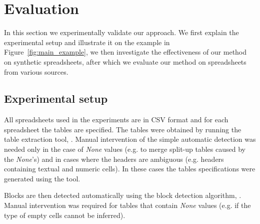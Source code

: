 \newcommand{\runtotal}{16.12}
\newcommand{\runtotalstd}{0.62}

\newcommand{\runfile}{0.50}
\newcommand{\runfilestd}{0.02}

\newcommand{\benchsize}{??}
\newcommand{\timeout}{200}

\section{Evaluation}\label{sec:evaluation}
In this section we experimentally validate our approach.
We first explain the experimental setup and illustrate it on the example in Figure~\ref{fig:main_example}, we then investigate the effectiveness of our method on synthetic spreadsheets, after which we evaluate our method on spreadsheets from various sources.

\subsection{Experimental setup}
\label{sec:evalualtion:method}
All spreadsheets used in the experiments are in CSV format and for each spreadsheet the tables are specified.
The tables were obtained by running the table extraction tool, \added{\ecautoextract}.
Manual intervention of the simple automatic detection was needed only in the case of \textit{None} values (e.g. to merge split-up tables caused by the \textit{None}'s) and in cases where the headers are ambiguous (e.g. headers containing textual and numeric cells).
In these cases the tables specifications were generated using the \added{\ecvisualextract{}} tool.

Blocks are then detected automatically using the block detection algorithm, \added{\ecblockdetect}.
Manual intervention was required for tables that contain \textit{None} values (e.g. if the type of empty cells cannot be inferred).


